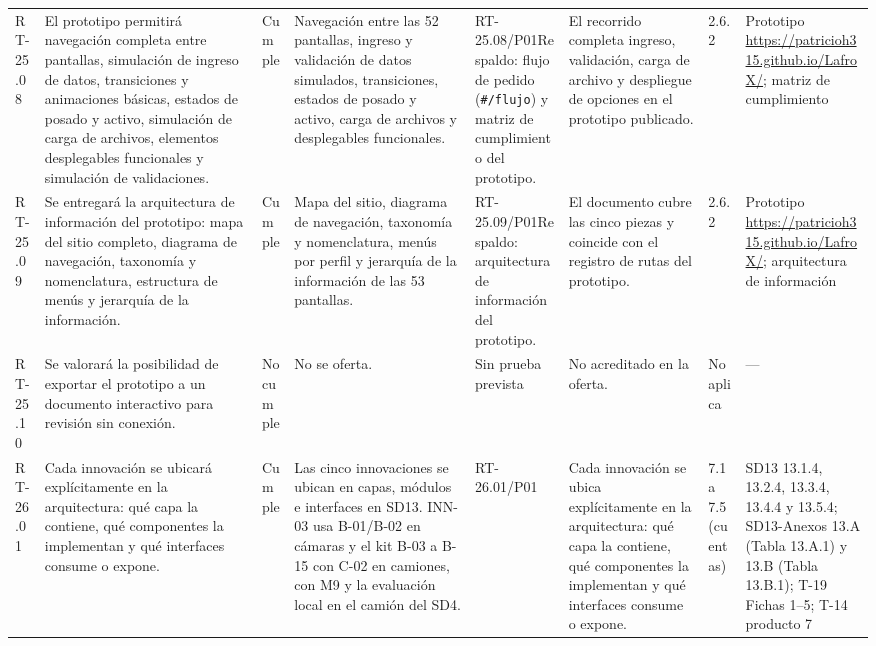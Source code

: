 \documentclass[oficio,firma,final]{lafrox}
\begin{document}
\begin{landscape}
{\begin{longtable}{@{}F{0.054} F{0.173} F{0.061} F{0.191} F{0.106} F{0.180} F{0.067} F{0.168}@{}}
  RT-25.08 & El prototipo permitirá navegación completa entre pantallas, simulación de ingreso de datos, transiciones y animaciones básicas, estados de posado y activo, simulación de carga de archivos, elementos desplegables funcionales y simulación de validaciones. & Cumple & Navegación entre las 52 pantallas, ingreso y validación de datos simulados, transiciones, estados de posado y activo, carga de archivos y desplegables funcionales. & RT-25.08/\allowbreak{}P01\newline Respaldo: flujo de pedido (\texttt{\#/flujo}) y matriz de cumplimiento del prototipo. & El recorrido completa ingreso, validación, carga de archivo y despliegue de opciones en el prototipo publicado. & 2.6.2 & Prototipo \url{https://patricioh315.github.io/LafroX/}; matriz de cumplimiento  \\
  RT-25.09 & Se entregará la arquitectura de información del prototipo: mapa del sitio completo, diagrama de navegación, taxonomía y nomenclatura, estructura de menús y jerarquía de la información. & Cumple & Mapa del sitio, diagrama de navegación, taxonomía y nomenclatura, menús por perfil y jerarquía de la información de las 53 pantallas. & RT-25.09/\allowbreak{}P01\newline Respaldo: arquitectura de información del prototipo. & El documento cubre las cinco piezas y coincide con el registro de rutas del prototipo. & 2.6.2 & Prototipo \url{https://patricioh315.github.io/LafroX/}; arquitectura de información  \\
  RT-25.10 & Se valorará la posibilidad de exportar el prototipo a un documento interactivo para revisión sin conexión. & No cumple & No se oferta. & Sin prueba prevista & No acreditado en la oferta. & No aplica & —  \\
  RT-26.01 & Cada innovación se ubicará explícitamente en la arquitectura: qué capa la contiene, qué componentes la implementan y qué interfaces consume o expone. & Cumple & Las cinco innovaciones se ubican en capas, módulos e interfaces en SD13. INN-03 usa B-01/B-02 en cámaras y el kit B-03 a B-15 con C-02 en camiones, con M9 y la evaluación local en el camión del SD4. & RT-26.01/\allowbreak{}P01 & Cada innovación se ubica explícitamente en la arquitectura: qué capa la contiene, qué componentes la implementan y qué interfaces consume o expone. & 7.1 a 7.5 (cuentas) & SD13 13.1.4, 13.2.4, 13.3.4, 13.4.4 y 13.5.4; SD13-Anexos 13.A (Tabla 13.A.1) y 13.B (Tabla 13.B.1); T-19 Fichas 1–5; T-14 producto 7  \\

\end{longtable}}
\end{landscape}
\end{document}
